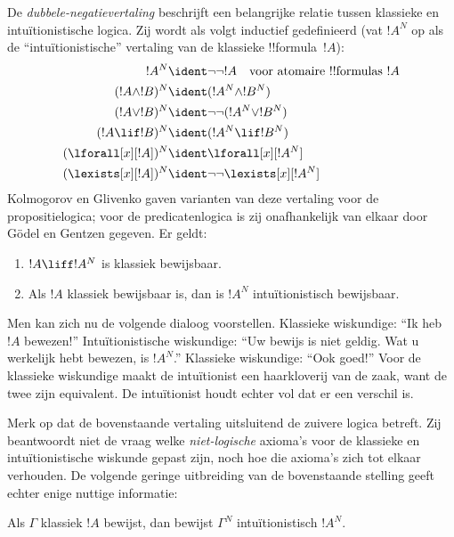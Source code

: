 \documentclass[openany]{memoir}
\begin{document}
De \emph{dubbele-negatievertaling} beschrijft een belangrijke relatie tussen
klassieke en intuïtionistische logica. Zij wordt als volgt inductief gedefinieerd
(vat $!A^N$ op als de ``intuïtionistische'' vertaling van de klassieke
!!{formula}~$!A$):
\begin{align*}
!A^N & \ident \lnot\lnot !A \quad \text{voor atomaire !!{formula}s $!A$} \\
(!A \land !B)^N & \ident (!A^N \land !B^N) \\
(!A \lor !B)^N & \ident  \lnot\lnot (!A^N \lor !B^N) \\
(!A \lif !B)^N & \ident (!A^N \lif !B^N) \\
(\lforall[x][!A])^N & \ident \lforall[x][!A^N] \\
(\lexists[x][!A])^N & \ident \lnot\lnot\lexists[x][!A^N]
\end{align*}
Kolmogorov en Glivenko gaven varianten van deze vertaling voor de
propositielogica; voor de predicatenlogica is zij onafhankelijk van elkaar door
G\"odel en Gentzen gegeven. Er geldt:

\begin{thm}
\begin{enumerate}
\item $!A \liff !A^N$ is klassiek bewijsbaar.
\item Als $!A$ klassiek bewijsbaar is, dan is $!A^N$ intuïtionistisch
  bewijsbaar.
\end{enumerate}
\end{thm}

Men kan zich nu de volgende dialoog voorstellen. Klassieke wiskundige: ``Ik heb
$!A$ bewezen!'' Intuïtionistische wiskundige: ``Uw bewijs is niet geldig. Wat u
werkelijk hebt bewezen, is $!A^N$.'' Klassieke wiskundige: ``Ook goed!'' Voor de
klassieke wiskundige maakt de intuïtionist een haarkloverij van de zaak, want de
twee zijn equivalent. De intuïtionist houdt echter vol dat er een verschil is.

Merk op dat de bovenstaande vertaling uitsluitend de zuivere logica betreft. Zij
beantwoordt niet de vraag welke \emph{niet-logische} axioma's voor de klassieke en
intuïtionistische wiskunde gepast zijn, noch hoe die axioma's zich tot elkaar
verhouden. De volgende geringe uitbreiding van de bovenstaande stelling geeft
echter enige nuttige informatie:

\begin{thm}
Als $\Gamma$ klassiek $!A$ bewijst, dan bewijst $\Gamma^N$
intuïtionistisch $!A^N$.
\end{thm}
\end{document}
